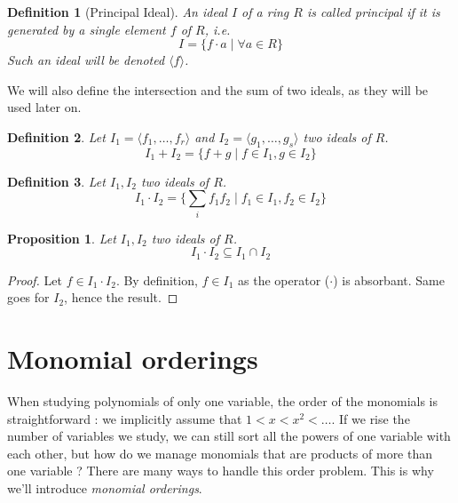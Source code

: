 \documentclass{article}
\newtheorem{definition}{Definition}[section]
\newtheorem{proposition}{Proposition}[section]
\begin{document}
\begin{definition}[Principal Ideal]
    An ideal $I$ of a ring $R$ is called principal if it is generated by a single element $f$ of $R$, \textit{i.e.}
    \begin{displaymath}
        I = \{f \cdot a \mid \forall a \in R\}
    \end{displaymath}
    Such an ideal will be denoted $\langle f \rangle$.
\end{definition}

We will also define the intersection and the sum of two ideals, as they will be used later on.


\begin{definition}
    Let $I_{1} = \langle f_{1}, \dots, f_{r} \rangle$ and  $I_{2} = \langle g_{1}, \dots, g_{s} \rangle $ two ideals of $R$. 
    \begin{displaymath}
        I_{1} + I_{2} = \{f + g \mid f \in I_{1}, g \in I_{2}\} %
    \end{displaymath}
\end{definition}

\begin{definition}
    Let $I_{1}, I_{2}$ two ideals of $R$. 
    \begin{displaymath}
        I_{1} \cdot I_{2} = \lbrace \sum_{i} f_{1}f_{2} \mid f_{1} \in I_{1}, f_{2} \in I_{2} \rbrace
    \end{displaymath}
\end{definition}

\begin{proposition}
    Let $I_{1}, I_{2}$ two ideals of $R$. 
    \begin{displaymath}
        I_{1} \cdot I_{2} \subseteq I_{1} \cap I_{2}
    \end{displaymath}
\end{proposition}

\begin{proof}
    Let $f \in I_{1} \cdot I_{2}$. By definition, $f \in I_{1}$ as the operator ($\cdot$) is absorbant. Same goes for $I_{2}$, hence the result.
\end{proof}

\section{Monomial orderings}

\par When studying polynomials of only one variable, the order of the monomials is straightforward : we implicitly assume that $1 < x < x^{2} < \dots$. If we rise the number of variables we study, we can still sort all the powers of one variable with each other, but how do we manage monomials that are products of more than one variable ? There are many ways to handle this order problem. This is why we'll introduce \textit{monomial orderings}.
\end{document}
